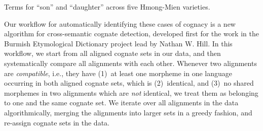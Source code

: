 \documentclass[xetex,svgnames]{scrartcl}
\begin{document}
\begin{table}[htb]
  \centering
  \caption{Terms for ``son'' and ``daughter'' across five Hmong-Mien varieties.}
  \label{tab:son}
\end{table}

Our workflow for automatically identifying these cases of cognacy is a new algorithm for
cross-semantic cognate detection, developed first for the work in the Burmish Etymological
Dictionary project lead by Nathan W. Hill. In this workflow, we start from all aligned cognate sets
in our data, and then systematically compare all alignments with each other. Whenever two
alignments are \emph{compatible}, i.e., they have (1)~at least one morpheme in one language
occurring in both aligned cognate sets, which is (2)~identical, and (3)~no shared morphemes in two
alignments which are \emph{not} identical, we treat them as belonging to one and the same cognate
set. We iterate over all alignments in the data algorithmically, merging the alignments into larger
sets in a greedy fashion, and re-assign cognate sets in the data.
\end{document}
